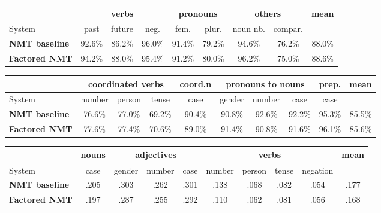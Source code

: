 \documentclass[11pt,letterpaper,final]{article}
\begin{document}
\begin{table*}[!ht] %
\begin{center}
\small
\begin{tabular}{ l|ccc|cc|cc||c } 
\hline
&  \multicolumn{3}{c}{\textbf{verbs}} & \multicolumn{2}{c}{\textbf{pronouns}}  & \multicolumn{2}{c}{\textbf{others}}  & \multicolumn{1}{c}{\textbf{mean}}\\
\hline
System & past & future & neg. & fem. & plur. & noun nb. & compar. & \\
\hline
\textbf{NMT baseline}      & 92.6\% & 86.2\% & 96.0\% & 91.4\% & 79.2\% & 94.6\% & 76.2\% & 88.0\% \\ 
\textbf{Factored NMT}      & 94.2\% & 88.0\% & 95.4\% & 91.2\% & 80.0\% & 96.2\% & 75.0\% & 88.6\% \\
\hline
 \end{tabular} 
\caption{\label{table:eval_cs_A} Sentence pair evaluation for English-to-Czech (A-set).}
\end{center}
\begin{center}
\small
\begin{tabular}{ l|ccc|c|ccc|c||c }
\hline
& \multicolumn{3}{c}{\textbf{coordinated verbs}} & \multicolumn{1}{c}{\textbf{coord.n}} & \multicolumn{3}{c}{\textbf{pronouns to nouns}} & \multicolumn{1}{c}{\textbf{prep.}} & \multicolumn{1}{c}{\textbf{mean}}\\
\hline
System & number & person & tense & case & gender & number & case & case & \\
\hline
\textbf{NMT baseline}       & 76.6\% & 77.0\% & 69.2\% & 90.4\% & 90.8\% & 92.6\% & 92.2\% & 95.3\% & 85.5\% \\
\textbf{Factored NMT}       & 77.6\% & 77.4\% & 70.6\% & 89.0\% & 91.4\% & 90.8\% & 91.6\% & 96.1\% & 85.6\% \\
\hline
 \end{tabular} 
\caption{\label{table:eval_cs_B} Sentence pair evaluation for English-to-Czech (B-set).}
\end{center}
\begin{center}
\small
\begin{tabular}{ l|c|ccc|cccc||c } 
\hline
& \multicolumn{1}{c}{\textbf{nouns}} & \multicolumn{3}{c}{\textbf{adjectives}} & \multicolumn{4}{c}{\textbf{verbs}} & \multicolumn{1}{c}{\textbf{mean}} \\
\hline
System & case & gender & number & case & number & person & tense & negation & \\
\hline
\textbf{NMT baseline}       & .205 & .303 & .262 & .301 & .138 & .068 & .082 & .054 & .177 \\ 
\textbf{Factored NMT}       & .197 & .287 & .255 & .292 & .110 & .062 & .081 & .056 & .168 \\ 
\hline
 \end{tabular} 
\caption{\label{table:eval_cs_C} Sentence group evaluation for English-to-Czech with Entropy (C-set).}
\end{center}


\end{table*}
\end{document}
